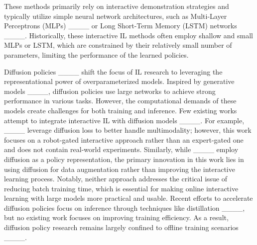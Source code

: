 These methods primarily rely on interactive demonstration strategies and typically utilize simple neural network architectures, such as Multi-Layer Perceptrons (MLPs) ____ or Long Short-Term Memory (LSTM) networks ____. Historically, these interactive IL methods often employ shallow and small MLPs or LSTM, which are constrained by their relatively small number of parameters, limiting the performance of the learned policies.

Diffusion policies ____ shift the focus of IL research to leveraging the representational power of overparameterized models. Inspired by generative models ____, diffusion policies use large networks to achieve strong performance in various tasks. However, the computational demands of these models create challenges for both training and inference. Few existing works attempt to integrate interactive IL with diffusion models ____. For example, ____ leverage diffusion loss to better handle multimodality; however, this work focuses on a robot-gated interactive approach rather than an expert-gated one and does not contain real-world experiments. Similarly, while ____ employ diffusion as a policy representation, the primary innovation in this work lies in using diffusion for data augmentation rather than improving the interactive learning process. Notably, neither approach addresses the critical issue of reducing batch training time, which is essential for making online interactive learning with large models more practical and usable. Recent efforts to accelerate diffusion policies focus on inference through techniques like distillation ____, but no existing work focuses on improving training efficiency. As a result, diffusion policy research remains largely confined to offline training scenarios ____.